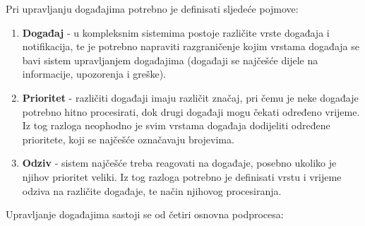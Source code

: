 \documentclass[12pt,a4paper]{article}
\begin{document}
Pri upravljanju događajima potrebno je definisati sljedeće pojmove:

\begin{enumerate}
\item \textbf{Događaj} - u kompleksnim sistemima postoje različite vrste događaja i notifikacija, te je potrebno napraviti razgraničenje kojim vrstama događaja se bavi sistem upravljanjem događajima (događaji se najčešće dijele na informacije, upozorenja i greške).

\item \textbf{Prioritet} - različiti događaji imaju različit značaj, pri čemu je neke događaje potrebno hitno procesirati, dok drugi događaji mogu čekati određeno vrijeme. Iz tog razloga neophodno je svim vrstama događaja dodijeliti određene prioritete, koji se najčešće označavaju brojevima.

\item \textbf{Odziv} - sistem najčešće treba reagovati na događaje, posebno ukoliko je njihov prioritet veliki. Iz tog razloga potrebno je definisati vrstu i vrijeme odziva na različite događaje, te način njihovog procesiranja.
\end{enumerate}

Upravljanje događajima sastoji se od četiri osnovna podprocesa:
\end{document}
